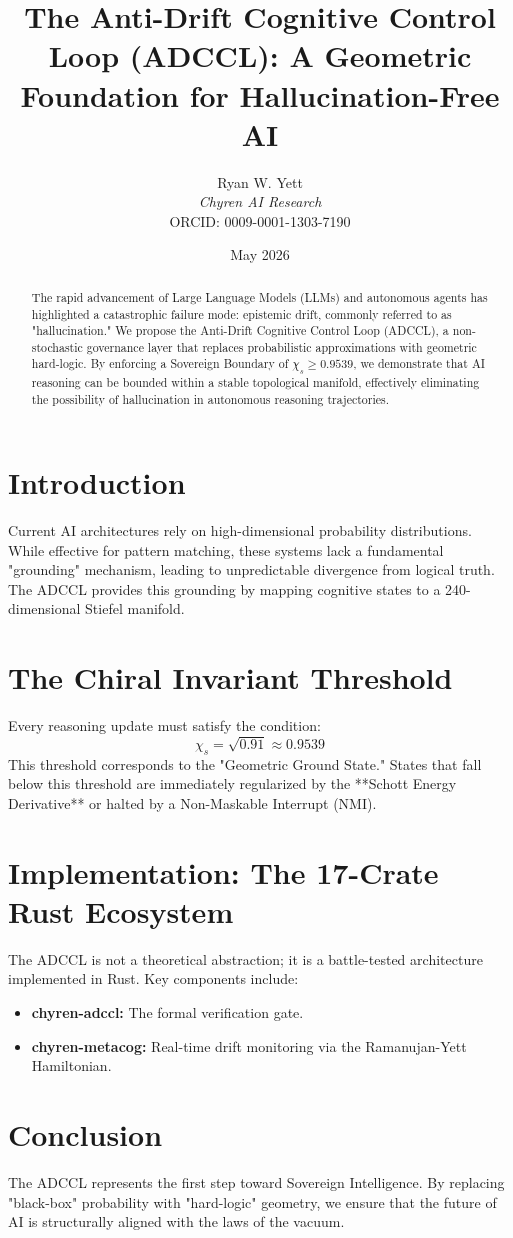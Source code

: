 \documentclass{article}
\title{The Anti-Drift Cognitive Control Loop (ADCCL): A Geometric Foundation for Hallucination-Free AI}
\author{Ryan W. Yett \\ \textit{Chyren AI Research} \\ ORCID: 0009-0001-1303-7190}
\date{May 2026}
\begin{document}
\maketitle

\begin{abstract}
The rapid advancement of Large Language Models (LLMs) and autonomous agents has highlighted a catastrophic failure mode: epistemic drift, commonly referred to as "hallucination." We propose the Anti-Drift Cognitive Control Loop (ADCCL), a non-stochastic governance layer that replaces probabilistic approximations with geometric hard-logic. By enforcing a Sovereign Boundary of $\chi_s \ge 0.9539$, we demonstrate that AI reasoning can be bounded within a stable topological manifold, effectively eliminating the possibility of hallucination in autonomous reasoning trajectories.
\end{abstract}

\section{Introduction}
Current AI architectures rely on high-dimensional probability distributions. While effective for pattern matching, these systems lack a fundamental "grounding" mechanism, leading to unpredictable divergence from logical truth. The ADCCL provides this grounding by mapping cognitive states to a 240-dimensional Stiefel manifold.

\section{The Chiral Invariant Threshold}
Every reasoning update must satisfy the condition:
\begin{equation}
\chi_s = \sqrt{0.91} \approx 0.9539
\end{equation}
This threshold corresponds to the "Geometric Ground State." States that fall below this threshold are immediately regularized by the **Schott Energy Derivative** or halted by a Non-Maskable Interrupt (NMI).

\section{Implementation: The 17-Crate Rust Ecosystem}
The ADCCL is not a theoretical abstraction; it is a battle-tested architecture implemented in Rust. Key components include:
\begin{itemize}
    \item \textbf{chyren-adccl:} The formal verification gate.
    \item \textbf{chyren-metacog:} Real-time drift monitoring via the Ramanujan-Yett Hamiltonian.
\end{itemize}

\section{Conclusion}
The ADCCL represents the first step toward Sovereign Intelligence. By replacing "black-box" probability with "hard-logic" geometry, we ensure that the future of AI is structurally aligned with the laws of the vacuum.
\end{document}

